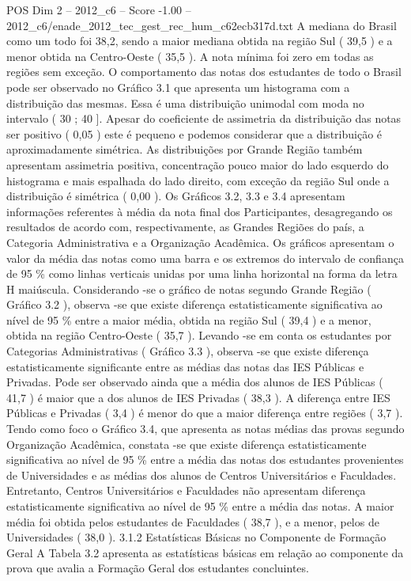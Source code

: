 \begin{textsample}{POS Dim 2 – 2012\_c6 – Score -1.00 – 2012\_c6/enade\_2012\_tec\_gest\_rec\_hum\_c62ecb317d.txt}
A mediana do Brasil como um todo foi 38,2, sendo a maior mediana obtida na região Sul ( 39,5 ) e a menor obtida na Centro-Oeste ( 35,5 ).
A nota mínima foi zero em todas as regiões sem exceção.
O comportamento das notas dos estudantes de todo o Brasil pode ser observado no Gráfico 3.1 que apresenta um histograma com a distribuição das mesmas.
Essa é uma distribuição unimodal com moda no intervalo ( 30 ; 40 ].
Apesar do coeficiente de assimetria da distribuição das notas ser positivo ( 0,05 ) este é pequeno e podemos considerar que a distribuição é aproximadamente simétrica.
As distribuições por Grande Região também apresentam assimetria positiva, concentração pouco maior do lado esquerdo do histograma e mais espalhada do lado direito, com exceção da região Sul onde a distribuição é simétrica ( 0,00 ).
Os Gráficos 3.2, 3.3 e 3.4 apresentam informações referentes à média da nota final dos Participantes, desagregando os resultados de acordo com, respectivamente, as Grandes Regiões do país, a Categoria Administrativa e a Organização Acadêmica.
Os gráficos apresentam o valor da média das notas como uma barra e os extremos do intervalo de confiança de 95 \% como linhas verticais unidas por uma linha horizontal na forma da letra H maiúscula.
Considerando -se o gráfico de notas segundo Grande Região ( Gráfico 3.2 ), observa -se que existe diferença estatisticamente significativa ao nível de 95 \% entre a maior média, obtida na região Sul ( 39,4 ) e a menor, obtida na região Centro-Oeste ( 35,7 ).
Levando -se em conta os estudantes por Categorias Administrativas ( Gráfico 3.3 ), observa -se que existe diferença estatisticamente significante entre as médias das notas das IES Públicas e Privadas.
Pode ser observado ainda que a média dos alunos de IES Públicas ( 41,7 ) é maior que a dos alunos de IES Privadas ( 38,3 ).
A diferença entre IES Públicas e Privadas ( 3,4 ) é menor do que a maior diferença entre regiões ( 3,7 ).
Tendo como foco o Gráfico 3.4, que apresenta as notas médias das provas segundo Organização Acadêmica, constata -se que existe diferença estatisticamente significativa ao nível de 95 \% entre a média das notas dos estudantes provenientes de Universidades e as médias dos alunos de Centros Universitários e Faculdades.
Entretanto, Centros Universitários e Faculdades não apresentam diferença estatisticamente significativa ao nível de 95 \% entre a média das notas.
A maior média foi obtida pelos estudantes de Faculdades ( 38,7 ), e a menor, pelos de Universidades ( 38,0 ). 3.1.2 Estatísticas Básicas no Componente de Formação Geral A Tabela 3.2 apresenta as estatísticas básicas em relação ao componente da prova que avalia a Formação Geral dos estudantes concluintes.

\end{textsample}
